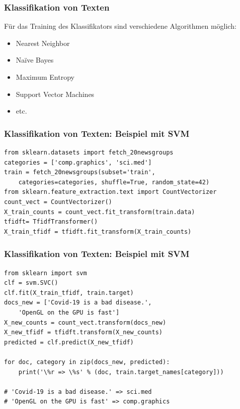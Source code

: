     
\begin{frame}
    \frametitle{Klassifikation von Texten}
 
    Für das Training des Klassifikators sind verschiedene Algorithmen möglich:\\
    \begin{itemize}
    \item Nearest Neighbor
    \item Naïve Bayes
    \item Maximum Entropy 
    \item Support Vector Machines
    \item etc.
    \end{itemize}
    
\end{frame}
    
    
\begin{frame}[fragile]
    \frametitle{Klassifikation von Texten: Beispiel mit SVM}
    
    \begin{verbatim}
from sklearn.datasets import fetch_20newsgroups
categories = ['comp.graphics', 'sci.med']
train = fetch_20newsgroups(subset='train',
    categories=categories, shuffle=True, random_state=42)
from sklearn.feature_extraction.text import CountVectorizer
count_vect = CountVectorizer()
X_train_counts = count_vect.fit_transform(train.data)
tfidft= TfidfTransformer()
X_train_tfidf = tfidft.fit_transform(X_train_counts)
    \end{verbatim}
\end{frame}
    
    
\begin{frame}[fragile]
    \frametitle{Klassifikation von Texten: Beispiel mit SVM}
    
    \begin{verbatim}
from sklearn import svm
clf = svm.SVC()
clf.fit(X_train_tfidf, train.target)
docs_new = ['Covid-19 is a bad disease.', 
    'OpenGL on the GPU is fast']
X_new_counts = count_vect.transform(docs_new)
X_new_tfidf = tfidft.transform(X_new_counts)
predicted = clf.predict(X_new_tfidf)

for doc, category in zip(docs_new, predicted):
    print('\%r => \%s' % (doc, train.target_names[category]))

# 'Covid-19 is a bad disease.' => sci.med
# 'OpenGL on the GPU is fast' => comp.graphics
    \end{verbatim}

\end{frame}
    

